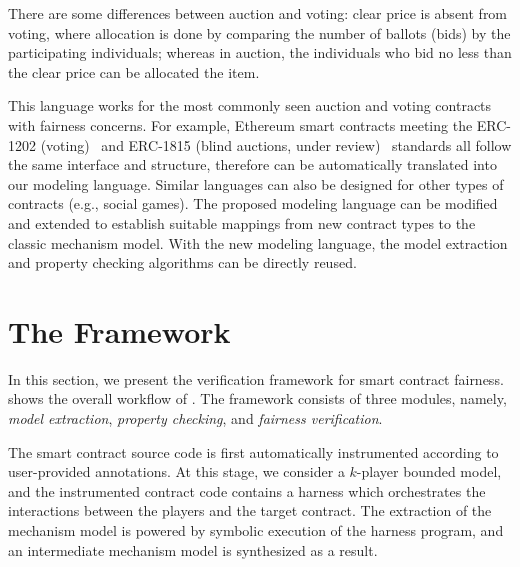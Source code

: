 There are some differences between auction and voting:
clear price is absent from voting, where allocation is done by comparing the number of ballots
(bids) by the participating individuals;
whereas in auction, the individuals who bid no less than the clear price can be allocated the item.

This language works for the most commonly seen auction and voting contracts with fairness concerns.
For example, Ethereum smart contracts meeting the ERC-1202 (voting)~\cite{erc-1202} and ERC-1815
(blind auctions, under review)~\cite{erc-1815} standards all follow the same interface and
structure, therefore can be automatically translated into our modeling language.
Similar languages can also be designed for other types of contracts (e.g., social games).
The proposed modeling language can be modified and extended to establish suitable mappings from new contract types to the classic mechanism model.
With the new modeling language, the model extraction and property checking algorithms can be
directly reused.


\section{The \faircon Framework}\label{Sec_Method}

In this section, we present the \faircon verification framework for smart contract fairness.
 shows the overall workflow of \faircon.
The framework consists of three modules, namely, \emph{model extraction}, \emph{property checking},
and \emph{fairness verification}.

The smart contract source code is first automatically instrumented according to user-provided
annotations.
At this stage, we consider a $k$-player bounded model, and the instrumented contract code contains
a harness which orchestrates the interactions between the players and the target contract.
The extraction of the mechanism model is powered by symbolic execution of the harness program, and
an intermediate mechanism model is synthesized as a result.


